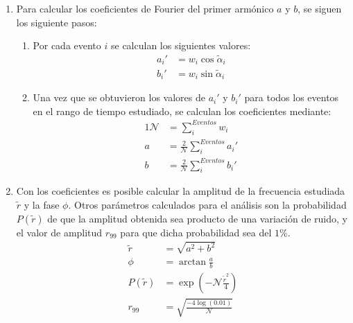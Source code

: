 \begin{enumerate}
        \item Para calcular los coeficientes de Fourier del primer armónico $a$ y $b$, se siguen los siguiente pasos:
        \begin{enumerate}
          \item Por cada evento  $i$ se calculan los siguientes valores:
          \begin{align}
             a_i' &= {w_i}\cos\tilde{\alpha}_i \\
             b_i' &= {w_i}\sin\tilde{\alpha}_i
         \end{align}
         \item Una vez que se obtuvieron los valores de $a_i'$ y $b_i'$ para todos los eventos en el rango de tiempo estudiado, se calculan los coeficientes mediante:
         \begin{alignat}{1}
          \mathcal{N} &= \sum^{Eventos}_i w_i \\
            a &= \frac{2}{\mathcal{N}} \sum^{Eventos}_i a_i' \\
            b &= \frac{2}{\mathcal{N}} \sum^{Eventos}_i b_i'  
         \end{alignat}
        \end{enumerate}
        \item Con los coeficientes es posible calcular la amplitud de la frecuencia estudiada $\tilde{r}$ y la fase $\phi$. Otros parámetros calculados para el análisis son la probabilidad $P(\tilde{r})$ de que la amplitud obtenida sea producto de una variación de ruido, y el valor de amplitud $r_{99}$ para que dicha probabilidad sea del $1$\%. 
        \begin{align}
            \tilde{r} &= \sqrt{a^2 +b^2} \\            
            \phi&= \arctan\frac{a}{b}\\
            P(\tilde{r})&= \exp(-\mathcal{N}\frac{\tilde{r}^2}{4}) \\
            r_{99}&= \sqrt{\frac{-4\log(0.01)}{\mathcal{N}}}
        \end{align}

      \end{enumerate}